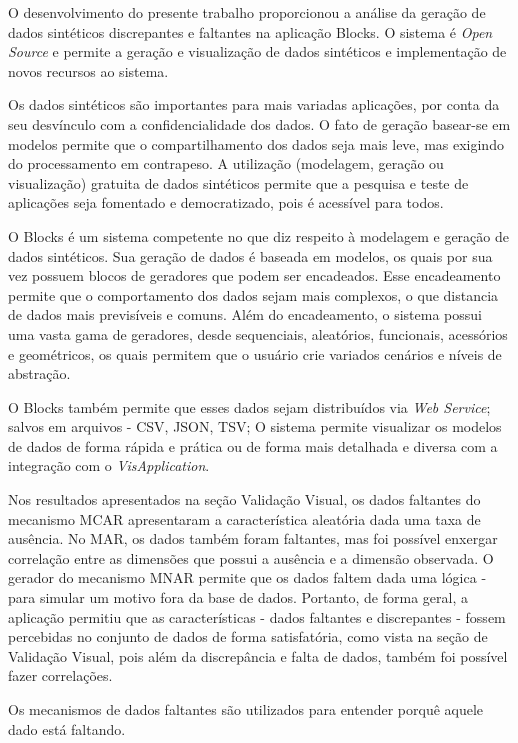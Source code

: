 \documentclass[
	12pt,				%
	openright,			%
	oneside,			%
	a4paper,			%
	english,			%
	brazil				%
	]{abntex2}
\begin{document}
O desenvolvimento do presente trabalho proporcionou a análise da geração de dados sintéticos discrepantes e faltantes na aplicação Blocks.
O sistema é \emph{Open Source} e permite a geração e visualização de dados sintéticos e implementação de novos recursos ao sistema.
\par
Os dados sintéticos são importantes para mais variadas aplicações, por conta da seu desvínculo com a confidencialidade dos dados.
O fato de geração basear-se em modelos permite que o compartilhamento dos dados seja mais leve, mas exigindo do processamento em contrapeso.
A utilização (modelagem, geração ou visualização) gratuita de dados sintéticos permite que a pesquisa e teste de aplicações seja fomentado e democratizado, pois é acessível para todos.
\par
O Blocks é um sistema competente no que diz respeito à modelagem e geração de dados sintéticos.
Sua geração de dados é baseada em modelos, os quais por sua vez possuem blocos de geradores que podem ser encadeados.
Esse encadeamento permite que o comportamento dos dados sejam mais complexos, o que distancia de dados mais previsíveis e comuns.
Além do encadeamento, o sistema possui uma vasta gama de geradores, desde sequenciais, aleatórios, funcionais, acessórios e geométricos, os quais permitem que o usuário crie variados cenários e níveis de abstração.
\par
O Blocks também permite que esses dados sejam distribuídos via \emph{Web Service};
 salvos em arquivos - CSV, JSON, TSV;
 O sistema permite visualizar os modelos de dados de forma rápida e prática ou de forma mais detalhada e diversa com a integração com o \emph{VisApplication}.
\par
Nos resultados apresentados na seção Validação Visual, os dados faltantes do mecanismo MCAR apresentaram a característica aleatória dada uma taxa de ausência. 
No MAR, os dados também foram faltantes, mas foi possível enxergar correlação entre as dimensões que possui a ausência e a dimensão observada. 
O gerador do mecanismo MNAR permite que os dados faltem dada uma lógica - para simular um motivo fora da base de dados.
Portanto, de forma geral, a aplicação permitiu que as características - dados faltantes e discrepantes - fossem percebidas no conjunto de dados de forma satisfatória, como vista na seção de Validação Visual, pois além da discrepância e falta de dados, também foi possível fazer correlações.
\par
Os mecanismos de dados faltantes são utilizados para entender porquê aquele dado está faltando.
\end{document}
